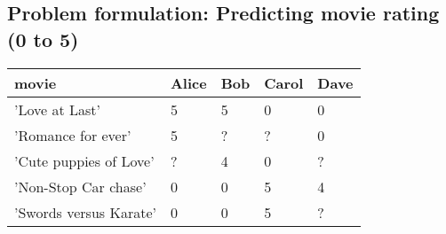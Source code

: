 \documentclass[a4paper,12pt]{report}
\begin{document}
\subsection{Problem formulation: Predicting movie rating (0 to 5)}
\begin{table}[H]
\begin{tabular}{|p{5cm}|p{2.5cm}|p{2.5cm}|p{2.5cm}|p{2cm}|}
\hline
\textbf{movie} & \textbf{Alice}  & \textbf{Bob}  & \textbf{Carol} & \textbf{Dave} \\
\hline
'Love at Last' & 5 & 5 & 0 & 0 \\
\hline
'Romance for ever' & 5 & ? & ? & 0 \\
\hline
'Cute puppies of Love' & ? & 4 & 0 & ? \\
\hline
'Non-Stop Car chase' & 0 & 0 & 5 & 4\\
\hline
'Swords versus Karate' & 0 & 0 & 5 & ?\\
\hline
\end{tabular}
\end{table}
\end{document}

